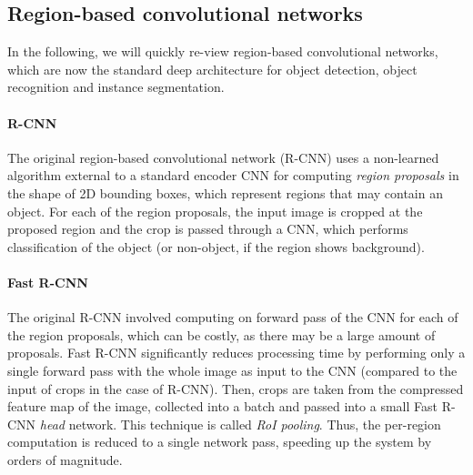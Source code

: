 


\subsection{Region-based convolutional networks}
In the following, we will quickly re-view region-based convolutional networks, which are now the standard deep architecture for
object detection, object recognition and instance segmentation.

\paragraph{R-CNN}
The original region-based convolutional network (R-CNN) uses a non-learned algorithm external to a standard encoder CNN
for computing \emph{region proposals} in the shape of 2D bounding boxes, which represent regions that may contain an object.
For each of the region proposals, the input image is cropped at the proposed region and the crop is
passed through a CNN, which performs classification of the object (or non-object, if the region shows background).

\paragraph{Fast R-CNN}
The original R-CNN involved computing on forward pass of the CNN for each of the region proposals,
which can be costly, as there may be a large amount of proposals.
Fast R-CNN significantly reduces processing time by performing only a single forward pass with the whole image
as input to the CNN (compared to the input of crops in the case of R-CNN).
Then, crops are taken from the compressed feature map of the image, collected into a batch and passed into a small Fast R-CNN
\emph{head} network.
This technique is called \emph{RoI pooling}. %
Thus, the per-region computation is reduced to a single network pass,
speeding up the system by orders of magnitude. %

